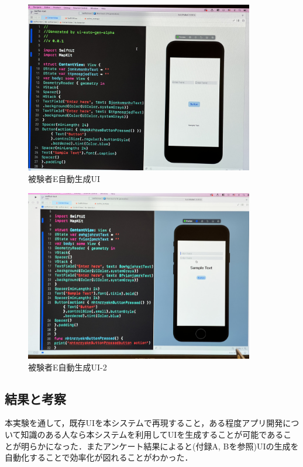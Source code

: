 \begin{figure}[htbp]
  \begin{minipage}{\hsize}
    \begin{center}
       \includegraphics[width=100mm]{img/usertest_autogen_5-1.jpeg}
    \end{center}
    \caption{被験者E自動生成UI}
    \label{fig:usertest_autogen_5-1}
  \end{minipage}
\end{figure}

\begin{figure}[htbp]
  \begin{minipage}{\hsize}
    \begin{center}
       \includegraphics[width=100mm]{img/usertest_autogen_5-2.jpeg}
    \end{center}
    \caption{被験者E自動生成UI-2}
    \label{fig:usertest_autogen_5-2}
  \end{minipage}
\end{figure}



\subsection{結果と考察}
本実験を通して，既存UIを本システムで再現すること，ある程度アプリ開発について知識のある人なら本システムを利用してUIを生成することが可能であることが明らかになった．またアンケート結果によると(付録A, Bを参照)UIの生成を自動化することで効率化が図れることがわかった．

